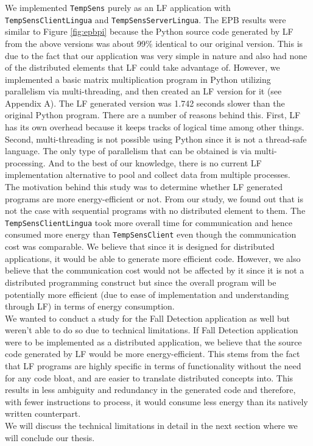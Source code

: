 We implemented \texttt{TempSens} purely as an LF application with \texttt{TempSensClientLingua} and 
\texttt{TempSensServerLingua}. The EPB results were similar to Figure \ref{fig:epbpi} because the Python 
source code generated by LF from the above versions was about 99\% identical to our original version. This 
is due to the fact that our application was very simple in nature and also had none of the distributed elements 
that LF could take advantage of. However, we implemented a basic matrix multiplication program in Python 
utilizing parallelism via multi-threading, and then created an LF version for it (see Appendix A). The LF generated 
version was 1.742 seconds slower than the original Python program. There are a number of reasons behind this. 
First, LF has its own overhead because it keeps tracks of logical time among other things. Second, multi-threading 
is not possible using Python since it is not a thread-safe language. The only type of parallelism that can be 
obtained is via multi-processing. And to the best of our knowledge, there is no current LF implementation alternative 
to pool and collect data from multiple processes. \\

The motivation behind this study was to determine whether LF generated programs are more energy-efficient or 
not. From our study, we found out that is not the case with sequential programs with no distributed element 
to them. The \texttt{TempSensClientLingua} took more overall time for communication and hence consumed more energy than 
\texttt{TempSensClient} even though the communication cost was comparable. We believe that since it is designed for 
distributed applications, it would be able to generate more efficient code. However, we also believe that 
the communication cost would not be affected by it since it is not a distributed programming construct but 
since the overall program will be potentially more efficient (due to ease of implementation and understanding 
through LF) in terms of energy consumption. \\
We wanted to conduct a study for the Fall Detection application as well but weren't able to do so due to 
technical limitations. If Fall Detection application were to be implemented as a distributed application, 
we believe that the source code generated by LF would be more energy-efficient. This stems from the fact that 
LF programs are highly specific in terms of functionality without the need for any code bloat, and are 
easier to translate distributed concepts into. This results in less ambiguity and redundancy in the generated 
code and therefore, with fewer instructions to process, it would consume less energy than its natively written 
counterpart. \\
We will discuss the technical limitations in detail in the next section where we will conclude our thesis.